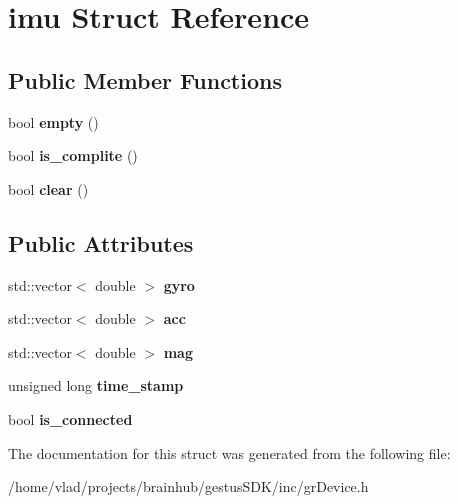 \hypertarget{structimu}{}\section{imu Struct Reference}
\label{structimu}
\subsection*{Public Member Functions}
\begin{DoxyCompactItemize}
\item 
\mbox{\label{structimu_aad015d789f4184b8e3f398a910965947}} 
bool {\bfseries empty} ()
\item 
\mbox{\label{structimu_a3ca47098c4c0902a2ee226651ab4f1c3}} 
bool {\bfseries is\+\_\+complite} ()
\item 
\mbox{\label{structimu_aca06ac68ca554729d999dd1bc2a36d24}} 
bool {\bfseries clear} ()
\end{DoxyCompactItemize}
\subsection*{Public Attributes}
\begin{DoxyCompactItemize}
\item 
\mbox{\label{structimu_aba52b1213ab81c45af29454ea9ca7805}} 
std\+::vector$<$ double $>$ {\bfseries gyro}
\item 
\mbox{\label{structimu_adac97b95e4d1161816b78ff3ff14dddb}} 
std\+::vector$<$ double $>$ {\bfseries acc}
\item 
\mbox{\label{structimu_aa5f359719d5d8c7dfac625dfe91de6cf}} 
std\+::vector$<$ double $>$ {\bfseries mag}
\item 
\mbox{\label{structimu_a6700c732f9a576450518747e4e74826e}} 
unsigned long {\bfseries time\+\_\+stamp}
\item 
\mbox{\label{structimu_a6d3d551ec276f287dede0b8f496027e3}} 
bool {\bfseries is\+\_\+connected}
\end{DoxyCompactItemize}


The documentation for this struct was generated from the following file\+:\begin{DoxyCompactItemize}
\item 
/home/vlad/projects/brainhub/gestus\+S\+D\+K/inc/gr\+Device.\+h\end{DoxyCompactItemize}
